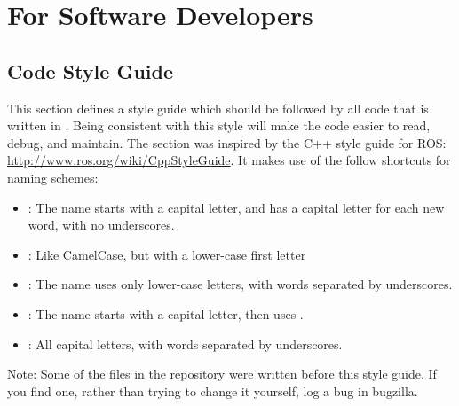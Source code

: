 
\chapter{For Software Developers}

\section{Code Style Guide}

This section defines a style guide which should be followed by all code that is written in \robotlib.  Being consistent with this style will make the code easier to read, debug, and maintain.  The section was inspired by the C++ style guide for ROS: \url{http://www.ros.org/wiki/CppStyleGuide}.  It makes use of the follow shortcuts for naming schemes:

\begin{itemize}
\item {}: The name starts with a capital letter, and has a capital letter for each new word, with no underscores.
\item {}: Like CamelCase, but with a lower-case first letter
\item {}: The name uses only lower-case letters, with words separated by underscores.
\item {}: The name starts with a capital letter, then uses .
\item {}: All capital letters, with words separated by underscores.
\end{itemize}

\noindent Note: Some of the files in the repository were written before this style guide.  
If you find one, rather than trying to change it yourself, log a bug in bugzilla.


